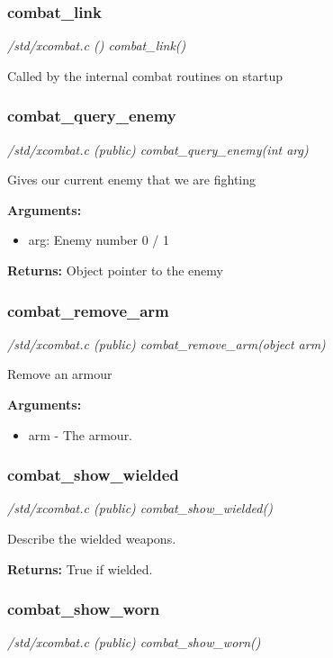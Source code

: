 \subsubsection{combat\_link}

{\em /std/xcombat.c () combat\_link()}

Called by the internal combat routines on startup


\subsubsection{combat\_query\_enemy}

{\em /std/xcombat.c (public) combat\_query\_enemy(int arg)}

Gives our current enemy that we are fighting

{\bf Arguments:}
\begin{itemize}
\item      arg: Enemy number 0 / 1
\end{itemize}

{\bf Returns:}        Object pointer to the enemy


\subsubsection{combat\_remove\_arm}

{\em /std/xcombat.c (public) combat\_remove\_arm(object arm)}

Remove an armour

{\bf Arguments:}
\begin{itemize}
\item     arm - The armour.
\end{itemize}


\subsubsection{combat\_show\_wielded}

{\em /std/xcombat.c (public) combat\_show\_wielded()}

Describe the wielded weapons.

{\bf Returns:}        True if wielded.


\subsubsection{combat\_show\_worn}

{\em /std/xcombat.c (public) combat\_show\_worn()}

